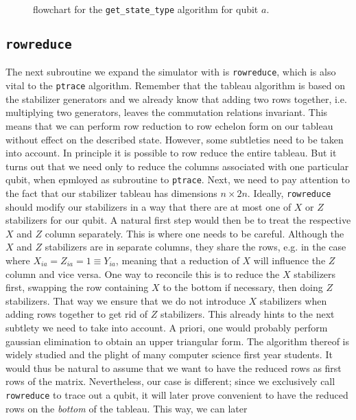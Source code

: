\begin{figure}[H]
  \centering
  
  \caption{flowchart for the \texttt{get\_state\_type} algorithm for qubit $a$.}
  \label{fig:statetype-diag}
\end{figure}

\subsection{\texttt{rowreduce}}
The next subroutine we expand the simulator with is \texttt{rowreduce}, which
is also vital to the \verb|ptrace| algorithm. Remember that the tableau
algorithm is based on the stabilizer generators and we already know that adding
two rows together, i.e. multiplying two generators, leaves the commutation
relations invariant. This means that we can perform row reduction to row
echelon form on our tableau without effect on the described state. However,
some subtleties need to be taken into account. In principle it is possible to
row reduce the entire tableau. But it turns out that we need only to reduce the
columns associated with one particular qubit, when epmloyed as subroutine to
\verb|ptrace|. Next, we need to pay attention to the fact that our stabilizer
tableau has dimensions $n\times 2n$. Ideally, \verb|rowreduce| should modify
our stabilizers in a way that there are at most one of $X$ or $Z$ stabilizers
for our qubit. A natural first step would then be to treat the respective $X$
and $Z$ column separately. This is where one needs to be careful. Although the $X$
and $Z$ stabilizers are in separate columns, they share the rows, e.g. in the
case where $X_{ia}=Z_{ia}=1\equiv Y_{ia}$, meaning that
a reduction of $X$ will influence the $Z$ column and vice versa. One way to
reconcile this is to reduce the $X$ stabilizers first, swapping the row
containing $X$ to the bottom if necessary, then doing $Z$ stabilizers. That way
we ensure that we do not introduce $X$ stabilizers when adding rows together
to get rid of $Z$ stabilizers. This already hints to the next subtlety we need
to take into account. A priori, one would probably perform gaussian
elimination to obtain an upper triangular form. The algorithm thereof is widely
studied and the plight of many computer science first year students. It would
thus be natural to assume that we want to have the reduced rows as first rows
of the matrix. Nevertheless, our case is different; since we exclusively call
\verb|rowreduce| to trace out a qubit, it will later prove convenient to have
the reduced rows on the \emph{bottom} of the tableau. This way, we can later
